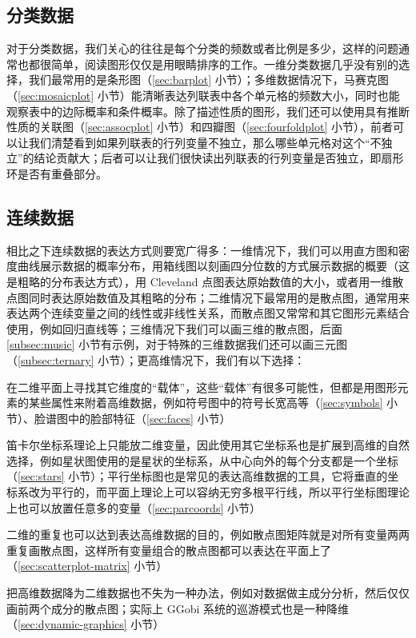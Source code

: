 \documentclass[
  b5paper,
  UTF8,twoside]{book}
\providecommand{\tightlist}{%
  \setlength{\itemsep}{0pt}\setlength{\parskip}{0pt}}
\begin{document}
\hypertarget{ux5206ux7c7bux6570ux636e}{%
\subsection{分类数据}\label{ux5206ux7c7bux6570ux636e}}

对于分类数据，我们关心的往往是每个分类的频数或者比例是多少，这样的问题通常也都很简单，阅读图形仅仅是用眼睛排序的工作。一维分类数据几乎没有别的选择，我们最常用的是条形图（\ref{sec:barplot} 小节）；多维数据情况下，马赛克图（\ref{sec:mosaicplot} 小节）能清晰表达列联表中各个单元格的频数大小，同时也能观察表中的边际概率和条件概率。除了描述性质的图形，我们还可以使用具有推断性质的关联图（\ref{sec:assocplot} 小节）和四瓣图（\ref{sec:fourfoldplot} 小节），前者可以让我们清楚看到如果列联表的行列变量不独立，那么哪些单元格对这个``不独立''的结论贡献大；后者可以让我们很快读出列联表的行列变量是否独立，即扇形环是否有重叠部分。

\hypertarget{ux8fdeux7eedux6570ux636e}{%
\subsection{连续数据}\label{ux8fdeux7eedux6570ux636e}}

相比之下连续数据的表达方式则要宽广得多：一维情况下，我们可以用直方图和密度曲线展示数据的概率分布，用箱线图以刻画四分位数的方式展示数据的概要（这是粗略的分布表达方式），用 Cleveland 点图表达原始数值的大小，或者用一维散点图同时表达原始数值及其粗略的分布；二维情况下最常用的是散点图，通常用来表达两个连续变量之间的线性或非线性关系，而散点图又常常和其它图形元素结合使用，例如回归直线等；三维情况下我们可以画三维的散点图，后面 \ref{subsec:music} 小节有示例，对于特殊的三维数据我们还可以画三元图（\ref{subsec:ternary} 小节）；更高维情况下，我们有以下选择：

\begin{description}
\tightlist
\item[寻找载体]
在二维平面上寻找其它维度的``载体''，这些``载体''有很多可能性，但都是用图形元素的某些属性来附着高维数据，例如符号图中的符号长宽高等（\ref{sec:symbols} 小节）、脸谱图中的脸部特征（\ref{sec:faces} 小节）
\item[更改坐标系]
笛卡尔坐标系理论上只能放二维变量，因此使用其它坐标系也是扩展到高维的自然选择，例如星状图使用的是星状的坐标系，从中心向外的每个分支都是一个坐标（\ref{sec:stars} 小节）；平行坐标图也是常见的表达高维数据的工具，它将垂直的坐标系改为平行的，而平面上理论上可以容纳无穷多根平行线，所以平行坐标图理论上也可以放置任意多的变量（\ref{sec:parcoords} 小节）
\item[重复二维图形]
二维的重复也可以达到表达高维数据的目的，例如散点图矩阵就是对所有变量两两重复画散点图，这样所有变量组合的散点图都可以表达在平面上了（\ref{sec:scatterplot-matrix} 小节）
\item[降维]
把高维数据降为二维数据也不失为一种办法，例如对数据做主成分分析，然后仅仅画前两个成分的散点图；实际上 GGobi 系统的巡游模式也是一种降维（\ref{sec:dynamic-graphics} 小节）
\end{description}
\end{document}
